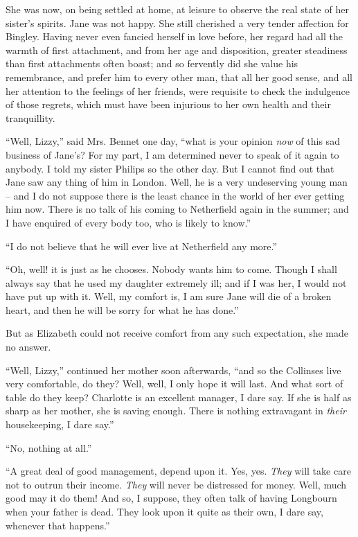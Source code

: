 She was now, on being settled at home, at leisure to
observe the real state of her sister’s spirits. Jane was
not happy. She still cherished a very tender affection
for Bingley. Having never even fancied herself in love
before, her regard had all the warmth of first attachment,
and from her age and disposition, greater steadiness than
first attachments often boast; and so fervently did she
value his remembrance, and prefer him to every other
man, that all her good sense, and all her attention to the
feelings of her friends, were requisite to check the indulgence
of those regrets, which must have been injurious
to her own health and their tranquillity.

“Well, Lizzy,” said Mrs. Bennet one day, “what is
your opinion \textit{now} of this sad business of Jane’s? For my
part, I am determined never to speak of it again to anybody.
I told my sister Philips so the other day. But
I cannot find out that Jane saw any thing of him in London.
Well, he is a very undeserving young man -- and I do not
suppose there is the least chance in the world of her ever
getting him now. There is no talk of his coming to Netherfield
again in the summer; and I have enquired of every
body too, who is likely to know.”

“I do not believe that he will ever live at Netherfield
any more.”

“Oh, well! it is just as he chooses. Nobody wants
him to come. Though I shall always say that he used
my daughter extremely ill; and if I was her, I would
not have put up with it. Well, my comfort is, I am sure
Jane will die of a broken heart, and then he will be sorry
for what he has done.”

But as Elizabeth could not receive comfort from any
such expectation, she made no answer.

“Well, Lizzy,” continued her mother soon afterwards,
“and so the Collinses live very comfortable, do they?
Well, well, I only hope it will last. And what sort of table
do they keep? Charlotte is an excellent manager, I dare
say. If she is half as sharp as her mother, she is saving
enough. There is nothing extravagant in \textit{their} housekeeping,
I dare say.”

“No, nothing at all.”

“A great deal of good management, depend upon it.
Yes, yes. \textit{They} will take care not to outrun their income.
\textit{They} will never be distressed for money. Well, much good
may it do them! And so, I suppose, they often talk of
having Longbourn when your father is dead. They look
upon it quite as their own, I dare say, whenever that
happens.”

